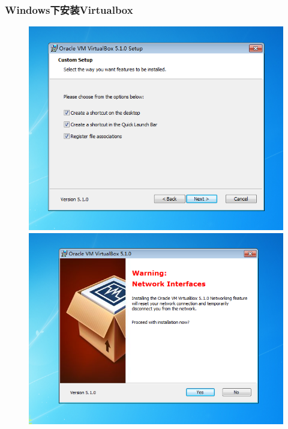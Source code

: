 \frame
{
	\frametitle{\textrm{Windows}下安装\textrm{Virtualbox}}
\begin{figure}[h!]
\centering
\vspace{25.5pt}
\includegraphics[height=0.37\textwidth]{Figures/Virtualbox-install-3.png}
\includegraphics[height=0.37\textwidth]{Figures/Virtualbox-install-4.png}
\caption{\textrm{\fontsize{6.2pt}{5.2pt}\selectfont{The install step-3 of Virtualbox.}}}
\label{Virtualbox-install-3}
\end{figure}
}

